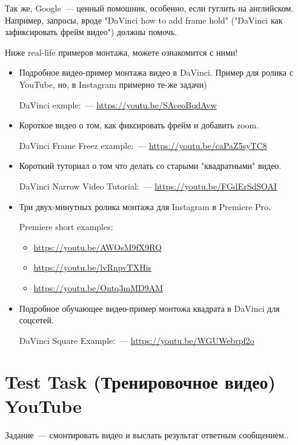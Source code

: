 \documentclass[
a4paper, %
12pt, %
article,
onecolumn, %
openany, %
]{memoir}
\begin{document}
Так же, Google~--- ценный помошник, особенно, если гуглить на английском.
Например, запросы, вроде
"DaVinci how to add frame hold" ("DaVinci как зафиксировать фрейм видео")
должны помочь.

Ниже real-life примеров монтажа, можете ознакомится с ними!
\begin{itemize}
    \item Подробное видео-пример монтажа видео в DaVinci.
        Пример для ролика с YouTube, но, в
        Instagram примерно те-же задачи)

        DaVinci exmple:~--- \href{https://youtu.be/SAceoBqdAvw}{https://youtu.be/SAceoBqdAvw}
    \item Короткое видео о том, как фиксировать фрейм и добавить zoom.

        DaVinci Frame Freez example:~--- \href{https://youtu.be/caPaZ5syTC8}{https://youtu.be/caPaZ5syTC8}
    \item Короткий туториал о том что делать со старыми "квадратными" видео.

        DaVinci Narrow Video Tutorial:~--- \href{https://youtu.be/FGdErSdSOAI}{https://youtu.be/FGdErSdSOAI}

    \item Три двух-минутных ролика монтажа для Instagram в Premiere Pro.

        Premiere short examples:
        \begin{itemize}
            \item \href{https://youtu.be/AWOsM9fX9RQ}{https://youtu.be/AWOsM9fX9RQ}
            \item \href{https://youtu.be/lvRnpvTXHis}{https://youtu.be/lvRnpvTXHis}
            \item \href{https://youtu.be/Ontq3mMD9AM}{https://youtu.be/Ontq3mMD9AM}
        \end{itemize}
    \item Подробное обучающее видео-пример монтожа квадрата в DaVinci для соцсетей. 

        DaVinci Square Example:~--- \href{https://youtu.be/WGUWebrpf2o}{https://youtu.be/WGUWebrpf2o}
\end{itemize}




\newpage
\section{Test Task (Тренировочное видео) YouTube}

Задание~--- смонтировать видео и выслать результат
ответным сообщением..
\end{document}
